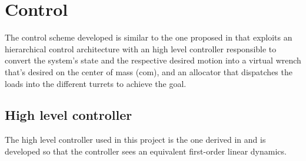 \section{Control} \label{sec:control}
The control scheme developed is similar to the one proposed in \cite{rospo} that exploits an hierarchical control architecture with an high level controller responsible to convert the system's state and the respective desired motion into a virtual wrench that's desired on the center of mass (com), and an allocator that dispatches the loads into the different turrets to achieve the goal.

\subsection{High level controller}
The high level controller used in this project is the one derived in \cite{rospo} and is developed so that the controller sees an equivalent first-order linear dynamics.

